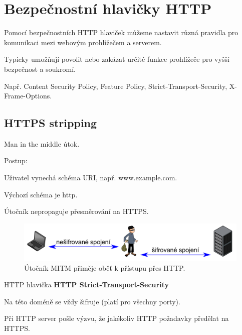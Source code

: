 
\section{Bezpečnostní hlavičky HTTP}

\begin{compactitem}
    \item Pomocí bezpečnostních HTTP hlaviček můžeme nastavit různá pravidla pro komunikaci mezi webovým prohlížečem a serverem.

    \item Typicky umožňují povolit nebo zakázat určité funkce prohlížeče pro vyšší bezpečnost a soukromí.

    \item Např. Content Security Policy, Feature Policy, Strict-Transport-Security, X-Frame-Options.
\end{compactitem}

\subsection{HTTPS stripping}

\begin{compactitem}
    \item Man in the middle útok.
    \item Postup: \begin{compactenum}
        \item Uživatel vynechá schéma URI, např. www.example.com.
        \item Výchozí schéma je http.
        \item Útočník nepropaguje přesměrování na HTTPS.
    \end{compactenum}

    \begin{figure}[H]
        \centering
        \includegraphics[width=0.9\linewidth]{https_stripping.pdf}
        \caption{Útočník MITM přiměje oběť k přístupu přes HTTP.}
    \end{figure}

    \item HTTP hlavička \textbf{HTTP Strict-Transport-Security} \begin{compactitem}
        \item Na této doméně se vždy šifruje (platí pro všechny porty).
        \item Při HTTP server pošle výzvu, že jakékoliv HTTP požadavky předělat na HTTPS.
    \end{compactitem}
\end{compactitem}

